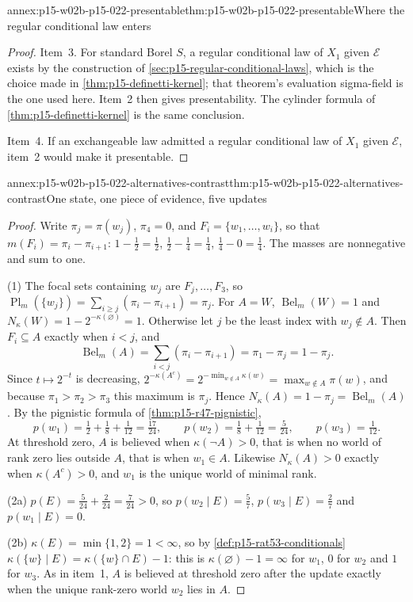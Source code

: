 \begin{annexitem}{annex:p15-w02b-p15-022-presentable}{thm:p15-w02b-p15-022-presentable}{Where the regular conditional law enters}
\begin{proof}
Item~3. For standard Borel \(S\), a regular conditional law of \(X_1\)
given \(\mathcal E\) exists by the construction of
\cref{sec:p15-regular-conditional-laws}, which is the choice made in
\cref{thm:p15-definetti-kernel}; that theorem's evaluation sigma-field is
the one used here. Item~2 then gives presentability. The cylinder formula
of \cref{thm:p15-definetti-kernel} is the same conclusion.

Item~4. If an exchangeable law admitted a regular conditional law of
\(X_1\) given \(\mathcal E\), item~2 would make it presentable.
\end{proof}
\end{annexitem}

\begin{annexitem}{annex:p15-w02b-p15-022-alternatives-contrast}{thm:p15-w02b-p15-022-alternatives-contrast}{One state, one piece of evidence, five updates}
\begin{proof}
Write \(\pi_j=\pi(w_j)\), \(\pi_4=0\), and \(F_i=\{w_1,\ldots,w_i\}\), so
that \(m(F_i)=\pi_i-\pi_{i+1}\): \(1-\tfrac12=\tfrac12\),
\(\tfrac12-\tfrac14=\tfrac14\), \(\tfrac14-0=\tfrac14\). The masses are
nonnegative and sum to one.

(1) The focal sets containing \(w_j\) are \(F_j,\ldots,F_3\), so
\(\operatorname{Pl}_m(\{w_j\})=\sum_{i\geq j}(\pi_i-\pi_{i+1})=\pi_j\).
For \(A=W\), \(\operatorname{Bel}_m(W)=1\) and
\(N_\kappa(W)=1-2^{-\kappa(\varnothing)}=1\). Otherwise let \(j\) be the
least index with \(w_j\notin A\). Then \(F_i\subseteq A\) exactly when
\(i<j\), and
\[
 \operatorname{Bel}_m(A)=\sum_{i<j}(\pi_i-\pi_{i+1})=\pi_1-\pi_j=1-\pi_j .
\]
Since \(t\mapsto2^{-t}\) is decreasing,
\(2^{-\kappa(A^c)}=2^{-\min_{w\notin A}\kappa(w)}=\max_{w\notin A}\pi(w)\),
and because \(\pi_1>\pi_2>\pi_3\) this maximum is \(\pi_j\). Hence
\(N_\kappa(A)=1-\pi_j=\operatorname{Bel}_m(A)\).
By the pignistic formula of \cref{thm:p15-r47-pignistic},
\[
 p(w_1)=\tfrac12+\tfrac18+\tfrac1{12}=\tfrac{17}{24},\qquad
 p(w_2)=\tfrac18+\tfrac1{12}=\tfrac5{24},\qquad
 p(w_3)=\tfrac1{12}.
\]
At threshold zero, \(A\) is believed when \(\kappa(\neg A)>0\), that is when
no world of rank zero lies outside \(A\), that is when \(w_1\in A\).
Likewise \(N_\kappa(A)>0\) exactly when \(\kappa(A^c)>0\), and \(w_1\) is the
unique world of minimal rank.

(2a) \(p(E)=\tfrac5{24}+\tfrac2{24}=\tfrac7{24}>0\), so
\(p(w_2\mid E)=\tfrac57\), \(p(w_3\mid E)=\tfrac27\) and
\(p(w_1\mid E)=0\).

(2b) \(\kappa(E)=\min\{1,2\}=1<\infty\), so by
\cref{def:p15-rat53-conditionals}
\(\kappa(\{w\}\mid E)=\kappa(\{w\}\cap E)-1\): this is
\(\kappa(\varnothing)-1=\infty\) for \(w_1\), \(0\) for \(w_2\) and \(1\) for
\(w_3\). As in item~1, \(A\) is believed at threshold zero after the update
exactly when the unique rank-zero world \(w_2\) lies in \(A\).


\end{proof}
\end{annexitem}
